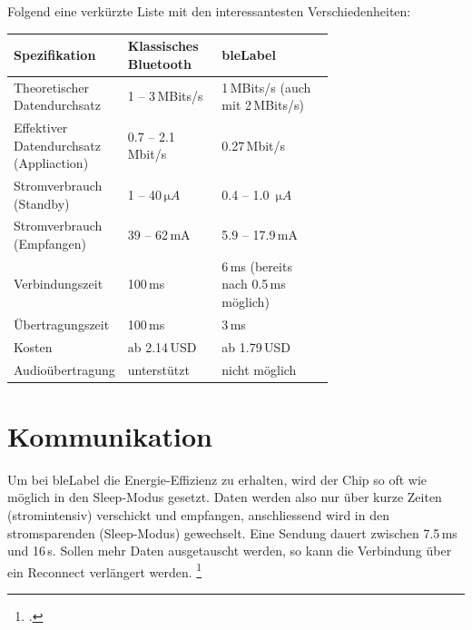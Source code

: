 Folgend eine verkürzte Liste mit den interessantesten Verschiedenheiten:
\begin{table}[H]
	\small\sffamily\renewcommand{\arraystretch}{1.4}
	\begin{tabular}{p{0.35\linewidth}lp{0.35\linewidth}}
		\toprule
		Spezifikation & Klassisches Bluetooth & \gls{bleLabel}\\
		\midrule
		Theoretischer Datendurchsatz & 1 -- 3\,MBits/s & 1\,MBits/s (auch mit 2\,MBits/s)\\
		Effektiver Datendurchsatz (Appliaction) & 0.7 -- 2.1\,Mbit/s	& 0.27\,Mbit/s\\
		
		Stromverbrauch (Standby) & 1 -- 40\,$\si{\micro A}$ &  0.4 -- 1.0 \,$\si{\micro A}$ \\
		Stromverbrauch (Empfangen) & 39 -- 62\,mA &  5.9 -- 17.9\,mA \\
		
		Verbindungszeit & 100\,ms & 6\,ms (bereits nach 0.5\,ms möglich)\\
		Übertragungszeit & 100\,ms & 3\,ms\\
		Kosten & ab 2.14\,USD & ab 1.79\,USD \\
		Audioübertragung & unterstützt & nicht möglich\\
		\bottomrule
	\end{tabular}
\end{table}


\section{Kommunikation}
Um bei \gls{bleLabel} die Energie-Effizienz zu erhalten, wird der Chip so oft wie möglich in den Sleep-Modus gesetzt. Daten werden also nur über kurze Zeiten (stromintensiv) verschickt und empfangen, anschliessend wird in den stromsparenden (Sleep-Modus) gewechselt.
Eine Sendung dauert zwischen 7.5\,ms und 16\,s.
Sollen mehr Daten ausgetauscht werden, so kann die Verbindung über ein Reconnect verlängert werden.
\footcite[][5]{ti_whitepaper_2015-05-08}

